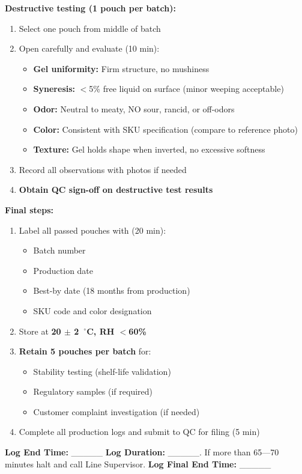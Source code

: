 {\textbf{Destructive testing (1 pouch per batch):}
\begin{enumerate}[resume,leftmargin=1.5em]
\item Select one pouch from middle of batch
\item Open carefully and evaluate (10 min):
  \begin{itemize}
  \item \textbf{Gel uniformity:} Firm structure, no mushiness
  \item \textbf{Syneresis:} $<$5\% free liquid on surface (minor weeping acceptable)
  \item \textbf{Odor:} Neutral to meaty, NO sour, rancid, or off-odors
  \item \textbf{Color:} Consistent with SKU specification (compare to reference photo)
  \item \textbf{Texture:} Gel holds shape when inverted, no excessive softness
  \end{itemize}
\item Record all observations with photos if needed
\item \textbf{Obtain QC sign-off on destructive test results}
\end{enumerate}

\textbf{Final steps:}
\begin{enumerate}[resume,leftmargin=1.5em]
\item Label all 
passed pouches with (20 min):
  \begin{itemize}
  \item Batch number
  \item Production date
  \item Best-by date (18 months from production)
  \item SKU code and color designation
  \end{itemize}
\item Store at \textbf{20 $\pm$ 2~$^\circ$C, RH $<$60\%}
\item \textbf{Retain 5 pouches per batch} for:
  \begin{itemize}
  \item Stability testing (shelf-life validation)
  \item Regulatory samples (if required)
  \item Customer complaint investigation (if needed)
  \end{itemize}
\item Complete all production logs and submit to QC for filing (5 min)
\end{enumerate}
\textbf{Log End Time:} \_\_\_\_\_
\textbf{Log Duration:} \_\_\_\_\_.
If more than 65---70 minutes halt and call Line Supervisor.
\textbf{Log Final End Time:} \_\_\_\_\_

}
